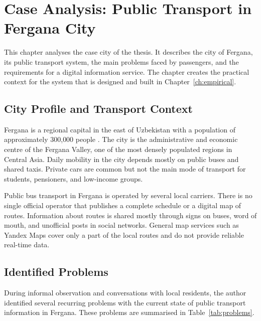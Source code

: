 \chapter{Case Analysis: Public Transport in Fergana City}
\label{ch:case}
\label{ch:analysis}

This chapter analyses the case city of the thesis. It describes the
city of Fergana, its public transport system, the main problems faced
by passengers, and the requirements for a digital information service.
The chapter creates the practical context for the system that is
designed and built in Chapter~\ref{ch:empirical}.

\section{City Profile and Transport Context}
\label{sec:city-profile}

Fergana is a regional capital in the east of Uzbekistan with a
population of approximately 300{,}000 people \cite{stat_uz_fergana}.
The city is the administrative and economic centre of the Fergana
Valley, one of the most densely populated regions in Central Asia. Daily
mobility in the city depends mostly on public buses and shared taxis.
Private cars are common but not the main mode of transport for
students, pensioners, and low-income groups.

Public bus transport in Fergana is operated by several local carriers.
There is no single official operator that publishes a complete schedule
or a digital map of routes. Information about routes is shared mostly
through signs on buses, word of mouth, and unofficial posts in social
networks. General map services such as Yandex Maps cover only a part of
the local routes and do not provide reliable real-time data.

\section{Identified Problems}
\label{sec:problems}

During informal observation and conversations with local residents, the
author identified several recurring problems with the current state of
public transport information in Fergana. These problems are
summarised in Table~\ref{tab:problems}.

